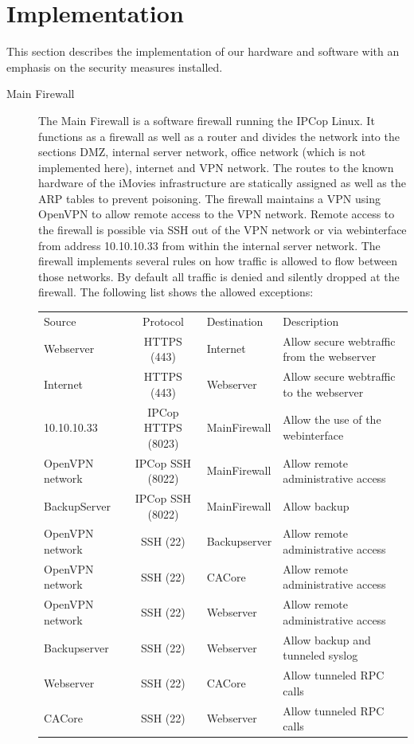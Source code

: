 \documentclass[a4paper, toc=index, 12pt, DIV14, twoside, BCOR2cm, headsepline, numbers=noenddot, bibliography=totoc]{scrbook}
\begin{document}
\section{Implementation}
This section describes the implementation of our hardware and software with an emphasis on the security measures installed.
\begin{description}
\item[Main Firewall ] The Main Firewall is a software firewall running the IPCop Linux. It functions as a firewall as well as a router and divides the network into the sections DMZ, internal server network, office network (which is not implemented here), internet and VPN network. The routes to the known hardware of the iMovies infrastructure are statically assigned as well as the ARP tables to prevent poisoning. The firewall maintains a VPN using OpenVPN to allow remote access to the VPN network. Remote access to the firewall is possible via SSH out of the VPN network or via webinterface from address 10.10.10.33 from within the internal server network. \newline
The firewall implements several rules on how traffic is allowed to flow between those networks. By default all traffic is denied and silently dropped at the firewall. The following list shows the allowed exceptions: \newline
\begin{tabular}{p{2.5cm} c l p{4cm}}
Source & Protocol & Destination & Description\\
\cline{1-4}
Webserver & HTTPS (443) & Internet & Allow secure webtraffic from the webserver \\
\cline{1-4}
Internet & HTTPS (443) & Webserver & Allow secure webtraffic to the webserver\\
\cline{1-4}
10.10.10.33 & IPCop HTTPS (8023) & MainFirewall & Allow the use of the webinterface\\
\cline{1-4}
OpenVPN network & IPCop SSH (8022) & MainFirewall & Allow remote administrative access\\
\cline{1-4}
BackupServer & IPCop SSH (8022) & MainFirewall & Allow backup\\
\cline{1-4}
OpenVPN network & SSH (22) & Backupserver & Allow remote administrative access \\
\cline{1-4}
OpenVPN network & SSH (22) & CACore & Allow remote administrative access \\
\cline{1-4}
OpenVPN network & SSH (22) & Webserver & Allow remote administrative access \\
\cline{1-4}
Backupserver & SSH (22) & Webserver & Allow backup and tunneled syslog\\
\cline{1-4}
Webserver & SSH (22) & CACore & Allow tunneled RPC calls\\
\cline{1-4}
CACore & SSH (22) & Webserver & Allow tunneled RPC calls \\
\end{tabular}


\end{description}
\end{document}
